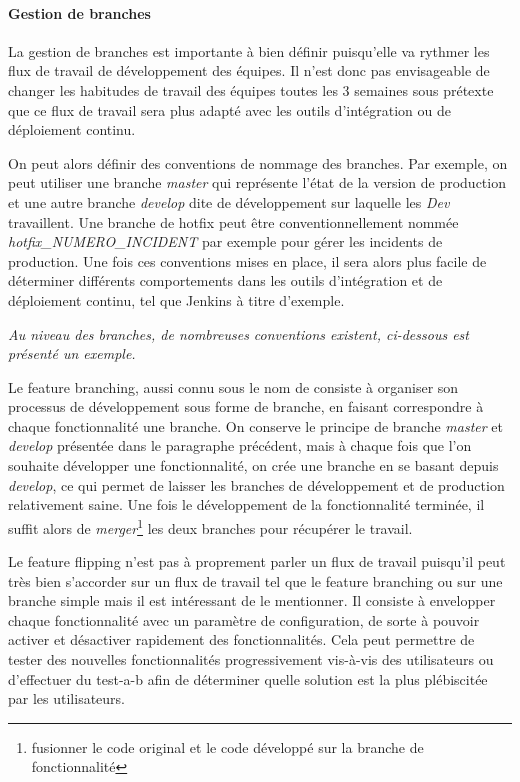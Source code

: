 \paragraph{Gestion de branches}

La gestion de branches est importante à bien définir puisqu'elle va rythmer les flux de travail de développement des équipes. Il n'est donc pas envisageable de changer les habitudes de travail des équipes toutes les 3 semaines sous prétexte que ce flux de travail sera plus adapté avec les outils d'intégration ou de déploiement continu.

On peut alors définir des conventions de nommage des branches. Par exemple, on peut utiliser une branche \emph{master} qui représente l'état de la version de production et une autre branche \emph{develop} dite de développement sur laquelle les \emph{Dev} travaillent. Une branche de \gls{hotfix} peut être conventionnellement nommée \emph{hotfix\_NUMERO\_INCIDENT} par exemple pour gérer les incidents de production. Une fois ces conventions mises en place, il sera alors plus facile de déterminer différents comportements dans les outils d'intégration et de déploiement continu, tel que Jenkins à titre d'exemple.

\emph{Au niveau des branches, de nombreuses conventions existent, ci-dessous est présenté un exemple.}

Le feature branching, aussi connu sous le nom de  consiste à organiser son processus de développement sous forme de branche, en faisant correspondre à chaque fonctionnalité une branche. On conserve le principe de branche \emph{master} et \emph{develop} présentée dans le paragraphe précédent, mais à chaque fois que l'on souhaite développer une fonctionnalité, on crée une branche en se basant depuis \emph{develop}, ce qui permet de laisser les branches de développement et de production relativement saine. Une fois le développement de la fonctionnalité terminée, il suffit alors de \emph{merger}\footnote{fusionner le code original et le code développé sur la branche de fonctionnalité} les deux branches pour récupérer le travail.


Le feature flipping n'est pas à proprement parler un flux de travail puisqu'il peut très bien s'accorder sur un flux de travail tel que le feature branching ou sur une branche simple mais il est intéressant de le mentionner. Il consiste à envelopper chaque fonctionnalité avec un paramètre de configuration, de sorte à pouvoir activer et désactiver rapidement des fonctionnalités. Cela peut permettre de tester des nouvelles fonctionnalités progressivement vis-à-vis des utilisateurs ou d'effectuer du \gls{test-a-b} afin de déterminer quelle solution est la plus plébiscitée par les utilisateurs. 

